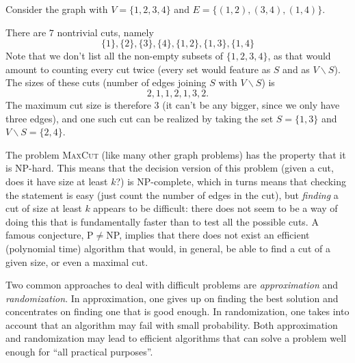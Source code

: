 \begin{example}
 Consider the graph with $V=\{1,2,3,4\}$ and $E=\{(1,2),(3,4),(1,4)\}$.
 \begin{figure}[h!]
  \centering
 \end{figure}
 There are $7$ nontrivial cuts, namely
 \begin{equation*}
  \{1\}, \{2\}, \{3\}, \{4\}, \{1,2\}, \{1,3\}, \{1,4\}
 \end{equation*}
Note that we don't list all the non-empty subsets of $\{1,2,3,4\}$, as that would amount to counting every cut twice (every set would feature as $S$ and as $V\backslash S$).
The sizes of these cuts (number of edges joining $S$ with $V\backslash S$) is
\begin{equation*}
 2, 1, 1, 2, 1, 3, 2.
\end{equation*}
The maximum cut size is therefore $3$ (it can't be any bigger, since we only have three edges), and one such cut can be realized by taking the set $S=\{1,3\}$ and $V\backslash S=\{2,4\}$. 
\end{example}

The problem \textsc{MaxCut} (like many other graph problems) has the property that it is NP-hard. This means that the decision version of this problem (given a cut, does it have size at least $k$?) is NP-complete, which in turns means that checking the statement is easy (just count the number of edges in the cut), but {\em finding} a cut of size at least $k$ appears to be difficult: there does not seem to be a way of doing this that is fundamentally faster than to test all the possible cuts. A famous conjecture, P$\neq$NP, implies that there does not exist an efficient (polynomial time) algorithm that would, in general, be able to find a cut of a given size, or even a maximal cut. 

Two common approaches to deal with difficult problems are {\em approximation} and {\em randomization}. In approximation, one gives up on finding the best solution and concentrates on finding one that is good enough. In randomization, one takes into account that an algorithm may fail with small probability. Both approximation and randomization may lead to efficient algorithms that can solve a problem well enough for ``all practical purposes''. 

